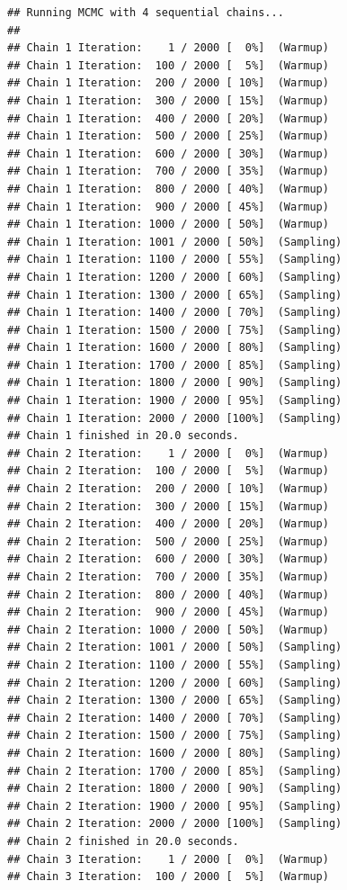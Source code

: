 \documentclass[
]{article}
\begin{document}
\begin{verbatim}
## Running MCMC with 4 sequential chains...
## 
## Chain 1 Iteration:    1 / 2000 [  0%]  (Warmup) 
## Chain 1 Iteration:  100 / 2000 [  5%]  (Warmup) 
## Chain 1 Iteration:  200 / 2000 [ 10%]  (Warmup) 
## Chain 1 Iteration:  300 / 2000 [ 15%]  (Warmup) 
## Chain 1 Iteration:  400 / 2000 [ 20%]  (Warmup) 
## Chain 1 Iteration:  500 / 2000 [ 25%]  (Warmup) 
## Chain 1 Iteration:  600 / 2000 [ 30%]  (Warmup) 
## Chain 1 Iteration:  700 / 2000 [ 35%]  (Warmup) 
## Chain 1 Iteration:  800 / 2000 [ 40%]  (Warmup) 
## Chain 1 Iteration:  900 / 2000 [ 45%]  (Warmup) 
## Chain 1 Iteration: 1000 / 2000 [ 50%]  (Warmup) 
## Chain 1 Iteration: 1001 / 2000 [ 50%]  (Sampling) 
## Chain 1 Iteration: 1100 / 2000 [ 55%]  (Sampling) 
## Chain 1 Iteration: 1200 / 2000 [ 60%]  (Sampling) 
## Chain 1 Iteration: 1300 / 2000 [ 65%]  (Sampling) 
## Chain 1 Iteration: 1400 / 2000 [ 70%]  (Sampling) 
## Chain 1 Iteration: 1500 / 2000 [ 75%]  (Sampling) 
## Chain 1 Iteration: 1600 / 2000 [ 80%]  (Sampling) 
## Chain 1 Iteration: 1700 / 2000 [ 85%]  (Sampling) 
## Chain 1 Iteration: 1800 / 2000 [ 90%]  (Sampling) 
## Chain 1 Iteration: 1900 / 2000 [ 95%]  (Sampling) 
## Chain 1 Iteration: 2000 / 2000 [100%]  (Sampling) 
## Chain 1 finished in 20.0 seconds.
## Chain 2 Iteration:    1 / 2000 [  0%]  (Warmup) 
## Chain 2 Iteration:  100 / 2000 [  5%]  (Warmup) 
## Chain 2 Iteration:  200 / 2000 [ 10%]  (Warmup) 
## Chain 2 Iteration:  300 / 2000 [ 15%]  (Warmup) 
## Chain 2 Iteration:  400 / 2000 [ 20%]  (Warmup) 
## Chain 2 Iteration:  500 / 2000 [ 25%]  (Warmup) 
## Chain 2 Iteration:  600 / 2000 [ 30%]  (Warmup) 
## Chain 2 Iteration:  700 / 2000 [ 35%]  (Warmup) 
## Chain 2 Iteration:  800 / 2000 [ 40%]  (Warmup) 
## Chain 2 Iteration:  900 / 2000 [ 45%]  (Warmup) 
## Chain 2 Iteration: 1000 / 2000 [ 50%]  (Warmup) 
## Chain 2 Iteration: 1001 / 2000 [ 50%]  (Sampling) 
## Chain 2 Iteration: 1100 / 2000 [ 55%]  (Sampling) 
## Chain 2 Iteration: 1200 / 2000 [ 60%]  (Sampling) 
## Chain 2 Iteration: 1300 / 2000 [ 65%]  (Sampling) 
## Chain 2 Iteration: 1400 / 2000 [ 70%]  (Sampling) 
## Chain 2 Iteration: 1500 / 2000 [ 75%]  (Sampling) 
## Chain 2 Iteration: 1600 / 2000 [ 80%]  (Sampling) 
## Chain 2 Iteration: 1700 / 2000 [ 85%]  (Sampling) 
## Chain 2 Iteration: 1800 / 2000 [ 90%]  (Sampling) 
## Chain 2 Iteration: 1900 / 2000 [ 95%]  (Sampling) 
## Chain 2 Iteration: 2000 / 2000 [100%]  (Sampling) 
## Chain 2 finished in 20.0 seconds.
## Chain 3 Iteration:    1 / 2000 [  0%]  (Warmup) 
## Chain 3 Iteration:  100 / 2000 [  5%]  (Warmup) 

\end{verbatim}
\end{document}
